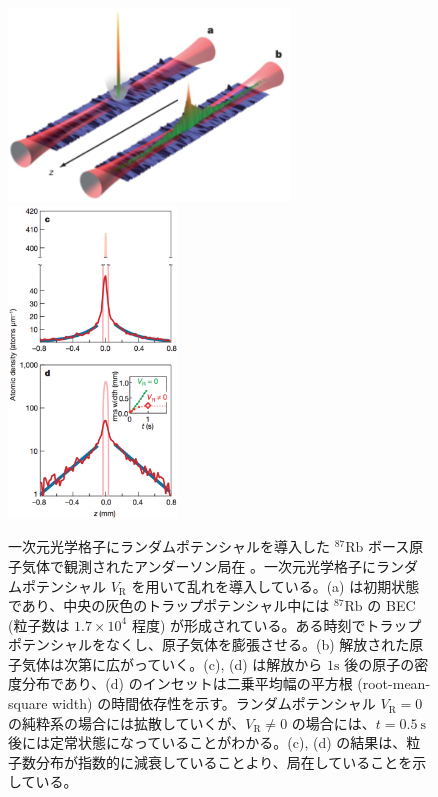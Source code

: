 \begin{figure}[t]
\centering
\includegraphics[width=75mm]{eps/laser-anderson.eps}
\includegraphics[width=45mm]{eps/imp-anderson-fig.eps}
\caption{一次元光学格子にランダムポテンシャルを導入した ${}^{87}\mathrm{Rb}$ ボース原子気体で観測されたアンダーソン局在 \cite{billy2008}。一次元光学格子にランダムポテンシャル $V_{\text{R}}$ を用いて乱れを導入している。(a) は初期状態であり、中央の灰色のトラップポテンシャル中には ${}^{87}\mathrm{Rb}$ の BEC (粒子数は $1.7 \times 10^4$ 程度) が形成されている。ある時刻でトラップポテンシャルをなくし、原子気体を膨張させる。(b) 解放された原子気体は次第に広がっていく。(c), (d) は解放から $1 \mathrm{s}$ 後の原子の密度分布であり、(d) のインセットは二乗平均幅の平方根 (root-mean-square width) の時間依存性を示す。ランダムポテンシャル $V_{\text{R}} =0$ の純粋系の場合には拡散していくが、$V_{\text{R}}\neq0$ の場合には、$t=0.5\ \text{s}$ 後には定常状態になっていることがわかる。(c), (d) の結果は、粒子数分布が指数的に減衰していることより、局在していることを示している。}
\label{fig:imp-localization}
\end{figure}


